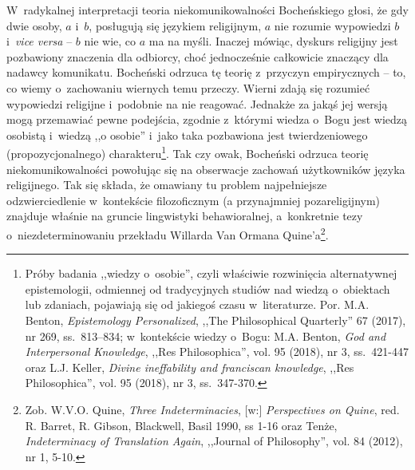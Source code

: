 W~radykalnej interpretacji teoria niekomunikowalności Bocheńskiego głosi, że gdy dwie osoby, $a$ i~$b$, posługują się językiem religijnym, $a$ nie rozumie wypowiedzi $b$ i~\textit{vice versa} -- $b$ nie wie, co $a$ ma na myśli. Inaczej mówiąc, dyskurs religijny jest pozbawiony znaczenia dla odbiorcy, choć jednocześnie całkowicie znaczący dla nadawcy komunikatu. Bocheński odrzuca tę teorię z~przyczyn empirycznych -- to, co wiemy o~zachowaniu wiernych temu przeczy. Wierni zdają się rozumieć wypowiedzi religijne i~podobnie na nie reagować. Jednakże za jakąś jej wersją mogą przemawiać pewne podejścia, zgodnie z~którymi wiedza o~Bogu jest wiedzą osobistą i~wiedzą ,,o osobie'' i~jako taka pozbawiona jest twierdzeniowego (propozycjonalnego) charakteru\footnote{Próby badania ,,wiedzy o~osobie'', czyli właściwie rozwinięcia alternatywnej epistemologii, odmiennej od tradycyjnych studiów nad wiedzą o~obiektach lub zdaniach, pojawiają się od jakiegoś czasu w~literaturze. Por. M.A. Benton, \textit{Epistemology Personalized}, ,,The Philosophical Quarterly'' 67 (2017), nr 269, ss.~813–834; w~kontekście wiedzy o~Bogu: M.A. Benton, \textit{God and Interpersonal Knowledge}, ,,Res Philosophica'', vol. 95 (2018), nr 3, ss.~421-447 oraz L.J. Keller, \textit{Divine ineffability and franciscan knowledge}, ,,Res Philosophica'', vol. 95 (2018), nr 3, ss.~347-370.}. Tak czy owak, Bocheński odrzuca teorię niekomunikowalności powołując się na obserwacje zachowań użytkowników języka religijnego. Tak się składa, że omawiany tu problem najpełniejsze odzwierciedlenie w~kontekście filozoficznym (a przynajmniej pozareligijnym) znajduje właśnie na gruncie lingwistyki behawioralnej, a~konkretnie tezy o~niezdeterminowaniu przekładu Willarda Van Ormana Quine'a\footnote{Zob. W.V.O. Quine, \textit{Three Indeterminacies}, [w:] \textit{Perspectives on Quine}, red. R. Barret, R. Gibson, Blackwell, Basil 1990, ss 1-16 oraz Tenże, \textit{Indeterminacy of Translation Again}, ,,Journal of Philosophy'', vol. 84 (2012), nr 1, 5-10.}.

